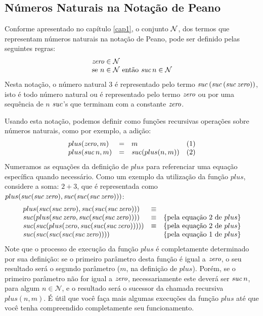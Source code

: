 \subsection{Números Naturais na Notação de Peano}


Conforme apresentado no capítulo \ref{cap1}, o conjunto $\mathcal{N}$, dos
termos que representam números naturais na notação de Peano, pode ser definido pelas seguintes regras:
\[
   \begin{array}{l}
     \textit{zero\/} \in \mathcal{N}\\
     \text{se $n \in \mathcal{N}$ ent\~ao $\textit{suc\/}\, n\in\mathcal{N}$}
   \end{array}
\]
Nesta notação, o número natural $3$ é representado pelo termo
$\textit{suc\/}\,(\textit{suc\/}\,(\textit{suc\/}\,\textit{zero\/}))$, isto é todo número natural ou é
representado pelo termo $\textit{zero\/}$ ou por uma sequência de $n$ $\textit{suc\/}$'s
que terminam com a constante $\textit{zero\/}$.

Usando esta notação, podemos definir como funções recursivas operações
sobre números naturais, como por exemplo, a adição:
\[
\begin{array}{lclc}
plus(\textit{zero\/},m) & = & m & (1)\\
plus(\textit{suc\/}\,n,m) & = & \textit{suc\/} (plus(n,m)) & (2)
\end{array}
\]
Numeramos as equações da definição de $plus$ para referenciar uma
equação específica quando necessário.
Como um exemplo da utilização da função $plus$, considere a soma: $2 + 3$, que é
representada como $plus(\textit{suc\/}(\textit{suc\/}\,\textit{zero\/}),\textit{suc\/}(\textit{suc\/}(\textit{suc\/}\,\textit{zero\/})))$:
\[
\begin{array}{lcl}
plus(\textit{suc\/}(\textit{suc\/}\,\textit{zero\/}),\textit{suc\/}(\textit{suc\/}(\textit{suc\/}\,\textit{zero\/}))) & \equiv \\
\textit{suc\/}(plus(\textit{suc\/}\,\textit{zero\/},\textit{suc\/}(\textit{suc\/}(\textit{suc\/}\,\textit{zero\/})))) & \equiv &
\{\text{pela equação $2$ de $plus$}\}\\
\textit{suc\/}(\textit{suc\/}(plus(\textit{zero\/},\textit{suc\/}(\textit{suc\/}(\textit{suc\/}\,\textit{zero\/}))))) & \equiv &
\{\text{pela equação $2$ de $plus$}\}\\
\textit{suc\/}(\textit{suc\/}(\textit{suc\/}(\textit{suc\/}(\textit{suc\/}\,\textit{zero\/})))) & & \{\text{pela equação $1$ de $plus$}\}
\end{array}
\]
Note que o processo de execução da função $plus$ é completamente
determinado por sua definição: se o primeiro parâmetro desta função é
igual a $\textit{zero\/}$, o seu resultado será o segundo parâmetro ($m$, na
definição de $plus$). Porém, se o primeiro parâmetro não for igual a
$\textit{zero\/}$, necessariamente este deverá ser $\textit{suc\/}\,n$, para algum
$n\in\mathcal{N}$, e o resultado será o sucessor da chamada recursiva
$plus(n,m)$. É útil que você faça mais algumas execuções da função
$plus$ até que você tenha compreendido completamente seu
funcionamento.

